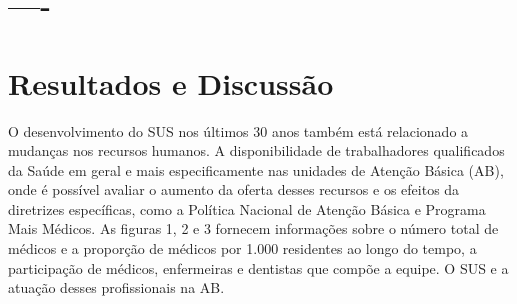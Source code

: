 \documentclass[twoside]{article}
\begin{document}
\begin{multicols}{2}
    \section{----}
      
\fi      


  
  \section{Resultados e Discussão}
  
O desenvolvimento do SUS nos últimos 30 anos também está relacionado a mudanças nos recursos 
humanos. A disponibilidade de trabalhadores qualificados da
Saúde em geral e mais especificamente
nas unidades de Atenção Básica (AB), onde é possível avaliar o aumento da oferta desses recursos e os efeitos da
diretrizes específicas, como a Política Nacional de
Atenção Básica e Programa Mais Médicos.
As figuras 1, 2 e 3 fornecem informações sobre o número total de médicos e a proporção de médicos por 1.000
residentes ao longo do tempo, a participação de médicos, enfermeiras e dentistas que compõe a equipe.
O SUS e a atuação desses profissionais na AB.



\iffalse



\end{multicols}
\end{document}
